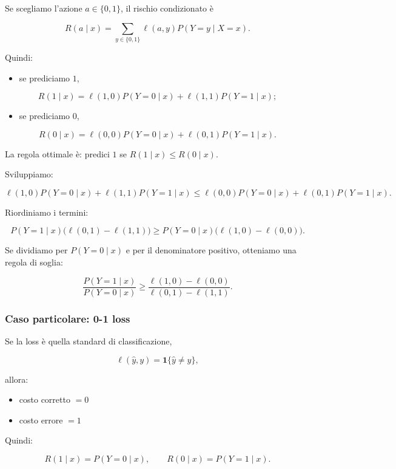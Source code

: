 \documentclass[
]{article}
\providecommand{\tightlist}{%
  \setlength{\itemsep}{0pt}\setlength{\parskip}{0pt}}
\begin{document}
Se scegliamo l'azione \(a\in\{0,1\}\), il rischio condizionato è

\[
R(a\mid x)=\sum_{y\in\{0,1\}}\ell(a,y)P(Y=y\mid X=x).
\]

Quindi:

\begin{itemize}
\tightlist
\item
  se prediciamo \(1\),
\end{itemize}

\[
R(1\mid x)=\ell(1,0)P(Y=0\mid x)+\ell(1,1)P(Y=1\mid x);
\]

\begin{itemize}
\tightlist
\item
  se prediciamo \(0\),
\end{itemize}

\[
R(0\mid x)=\ell(0,0)P(Y=0\mid x)+\ell(0,1)P(Y=1\mid x).
\]

La regola ottimale è: predici \(1\) se \(R(1\mid x)\le R(0\mid x)\).

Sviluppiamo:

\[
\ell(1,0)P(Y=0\mid x)+\ell(1,1)P(Y=1\mid x)
\le
\ell(0,0)P(Y=0\mid x)+\ell(0,1)P(Y=1\mid x).
\]

Riordiniamo i termini:

\[
P(Y=1\mid x)\big(\ell(0,1)-\ell(1,1)\big)
\ge
P(Y=0\mid x)\big(\ell(1,0)-\ell(0,0)\big).
\]

Se dividiamo per \(P(Y=0\mid x)\) e per il denominatore positivo,
otteniamo una regola di soglia:

\[
\frac{P(Y=1\mid x)}{P(Y=0\mid x)}
\ge
\frac{\ell(1,0)-\ell(0,0)}{\ell(0,1)-\ell(1,1)}.
\]

\subsubsection{Caso particolare: 0-1
loss}\label{caso-particolare-0-1-loss}

Se la loss è quella standard di classificazione,

\[
\ell(\hat y,y)=\mathbf{1}\{\hat y\neq y\},
\]

allora:

\begin{itemize}
\tightlist
\item
  costo corretto \(=0\)
\item
  costo errore \(=1\)
\end{itemize}

Quindi:

\[
R(1\mid x)=P(Y=0\mid x), \qquad R(0\mid x)=P(Y=1\mid x).
\]
\end{document}
